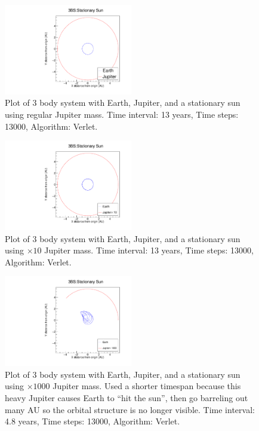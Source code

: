 \documentclass[a4paper,12pt]{report}
\begin{document}
 \begin{figure}[H]
 \centering
   \includegraphics[width=0.5\textwidth]{ESJFVerlet_reg.pdf}
  \caption{Plot of 3 body system with Earth, Jupiter, and a stationary sun using regular Jupiter mass. Time interval: 13 years, Time steps: 13000, Algorithm: Verlet.}
  \label{fig:ESJFVerlet_reg}
 \end{figure}
 
  \begin{figure}[H]
 \centering
   \includegraphics[width=0.5\textwidth]{ESJFVerlet_x10.pdf}
  \caption{Plot of 3 body system with Earth, Jupiter, and a stationary sun using $\times 10$ Jupiter mass. Time interval: 13 years, Time steps: 13000, Algorithm: Verlet.}
  \label{fig:ESJFVerlet_x10}
 \end{figure}
 
  \begin{figure}[H]
 \centering
   \includegraphics[width=0.5\textwidth]{ESJFVerlet_x1000.pdf}
  \caption{Plot of 3 body system with Earth, Jupiter, and a stationary sun using $\times 1000$ Jupiter mass. Used a shorter timespan because this heavy Jupiter causes Earth to ``hit the sun'', then go barreling out many AU so the orbital structure is no longer visible. Time interval: 4.8 years, Time steps: 13000, Algorithm: Verlet.}
  \label{fig:ESJFVerlet_x1000}
 \end{figure}
 
\end{document}
